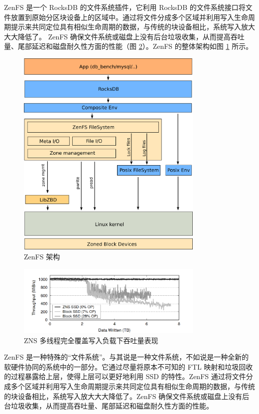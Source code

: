 ZenFS 是一个 RocksDB 的文件系统插件，它利用 RocksDB 的文件系统接口将文件放置到原始分区块设备上的区域中。通过将文件分成多个区域并利用写入生命周期提示来共同定位具有相似生命周期的数据，与传统的块设备相比，系统写入放大大大降低了。 ZenFS 确保文件系统或磁盘上没有后台垃圾收集，从而提高吞吐量、尾部延迟和磁盘耐久性方面的性能（图 \ref{zns-write}）。ZenFS 的整体架构如图 \ref{zenfs-overview} 所示。\cite{bjorling_zns_nodate}

\begin{figure}[htbp]
    \centering
    \includegraphics[width=0.8\textwidth]{fig/zenfs-overview}
    \caption{ZenFS 架构}
    \label{zenfs-overview}
\end{figure}

\begin{figure}[htbp]
    \centering
    \includegraphics[width=0.8\textwidth]{fig/zns-write}
    \caption{ZNS 多线程完全覆盖写入负载下吞吐量表现}
    \label{zns-write}
\end{figure}

ZenFS 是一种特殊的“文件系统”。与其说是一种文件系统，不如说是一种全新的软硬件协同的系统中的一部分。它通过尽量将原本不可知的 FTL 映射和垃圾回收的过程暴露给上层，使得上层可以更好地利用 SSD 的特性。ZenFS 通过将文件分成多个区域并利用写入生命周期提示来共同定位具有相似生命周期的数据，与传统的块设备相比，系统写入放大大大降低了。ZenFS 确保文件系统或磁盘上没有后台垃圾收集，从而提高吞吐量、尾部延迟和磁盘耐久性方面的性能。

